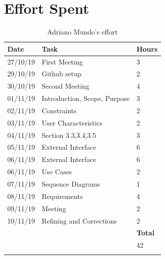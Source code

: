 \documentclass {article}
\begin{document}
\pagebreak
\section{Effort Spent}

\begin{longtable}{| p{2 cm} | p{6 cm} | p{1 cm} |} 
			\hline
			{\bf Date} & {\bf Task} & {\bf Hours}\\
			\hline
			27/10/19 & First Meeting & 3 \\
			\hline
			29/10/19 & Github setup & 2 \\
			\hline
			30/10/19 & Second Meeting & 4 \\
			\hline
			01/11/19 & Introduction, Scope, Purpose & 3 \\
			\hline
			02/11/19 & Constraints & 2 \\
			\hline
			03/11/19 & User Characteristics & 2 \\
			\hline
			04/11/19 & Section 3.3,3.4,3.5 & 3 \\
			\hline
			05/11/19 & External Interface & 6 \\
			\hline
			06/11/19 & External Interface & 6 \\
			\hline
			06/11/19 & Use Cases & 2 \\
			\hline
			07/11/19 & Sequence Diagrams  & 1 \\
			\hline
			08/11/19 & Requirements & 4 \\
			\hline
			09/11/19 & Meeting & 2 \\
			\hline
			10/11/19 & Refining and Corrections & 2 \\
			\hline
			& & {\bf Total} \\
			\hline
			& & 42 \\
			\hline
			\caption{Adriano Mundo's effort} 
\end{longtable}
\end{document}
